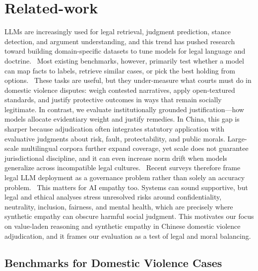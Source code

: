 \documentclass[pdflatex,sn-mathphys-ay]{sn-jnl}%
\theoremstyle{thmstyleone}%
\theoremstyle{thmstyletwo}%
\theoremstyle{thmstylethree}%
\begin{document}
\section{Related-work}\label{sec2}
LLMs are increasingly used for legal retrieval, judgment prediction, stance detection, and argument understanding, and this trend has pushed research toward building domain-specific datasets to tune models for legal language and doctrine.~\cite{xiao_cail2018_2018} Most existing benchmarks, however, primarily test whether a model can map facts to labels, retrieve similar cases, or pick the best holding from options.~\cite{zheng_when_2021} These tasks are useful, but they under-measure what courts must do in domestic violence disputes: weigh contested narratives, apply open-textured standards, and justify protective outcomes in ways that remain socially legitimate. In contrast, we evaluate institutionally grounded justification---how models allocate evidentiary weight and justify remedies. In China, this gap is sharper because adjudication often integrates statutory application with evaluative judgments about risk, fault, protectability, and public morals. Large-scale multilingual corpora further expand coverage, yet scale does not guarantee jurisdictional discipline, and it can even increase norm drift when models generalize across incompatible legal cultures.~\cite{niklaus_multilegalpile_2023} Recent surveys therefore frame legal LLM deployment as a governance problem rather than solely an accuracy problem.~\cite{dehghani_large_2025} This matters for AI empathy too. Systems can sound supportive, but legal and ethical analyses stress unresolved risks around confidentiality, neutrality, inclusion, fairness, and mental health, which are precisely where synthetic empathy can obscure harmful social judgment. This motivates our focus on value-laden reasoning and synthetic empathy in Chinese domestic violence adjudication, and it frames our evaluation as a test of legal and moral balancing.

\subsection{Benchmarks for Domestic Violence Cases}\label{subsec2}
\end{document}
